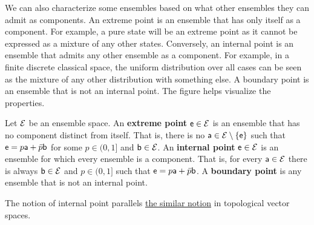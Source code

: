 We can also characterize some ensembles based on what other ensembles they can admit as components. An extreme point is an ensemble that has only itself as a component. For example, a pure state will be an extreme point as it cannot be expressed as a mixture of any other states. Conversely, an internal point is an ensemble that admits any other ensemble as a component. For example, in a finite discrete classical space, the uniform distribution over all cases can be seen as the mixture of any other distribution with something else. A boundary point is an ensemble that is not  an internal point. The figure helps visualize the properties.

\begin{mathSection}
\begin{defn}
	Let $\Ens$ be an ensemble space. An \textbf{extreme point} $\ens \in \Ens$ is an ensemble that has no component distinct from itself. That is, there is no $\ens[a] \in \Ens\setminus\{ \ens \}$ such that $\ens = p \ens[a] + \bar{p} \ens[b]$ for some $p \in (0,1]$ and $\ens[b] \in \Ens$. An \textbf{internal point} $\ens \in \Ens$ is an ensemble for which every ensemble is a component. That is, for every $\ens[a] \in \Ens$ there is always $\ens[b] \in \Ens$ and $p \in (0,1]$ such that $\ens = p \ens[a] + \bar{p} \ens[b]$. A \textbf{boundary point} is any ensemble that is not an internal point.
\end{defn}

\begin{remark}
	The notion of internal point parallels \href{https://en.wikipedia.org/wiki/Algebraic_interior}{the similar notion} in topological vector spaces.
\end{remark}

\begin{figure}[H]
	\centering
\end{figure}
\end{mathSection}
